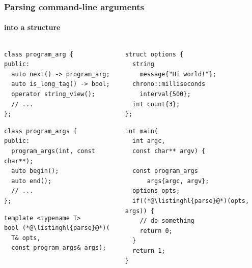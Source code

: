 \documentclass[compress,table,xcolor=table]{beamer}
\begin{document}
\begin{frame}[fragile]
  \frametitle{Parsing command-line arguments}
  \framesubtitle{into a structure}
  \begin{columns}
    \begin{column}{.57\textwidth}
      \begin{lstlisting}[language=c++2x,basicstyle=\scriptsize\ttfamily]
class program_arg {
public:
  auto next() -> program_arg;
  auto is_long_tag() -> bool;
  operator string_view();
  // ...
};
      \end{lstlisting}
      \vfill
      \begin{lstlisting}[language=c++2x,basicstyle=\scriptsize\ttfamily]
class program_args {
public:
  program_args(int, const char**); 
  auto begin();
  auto end();
  // ...
};
      \end{lstlisting}
      \vfill
      \begin{lstlisting}[language=c++2x,basicstyle=\scriptsize\ttfamily]
template <typename T>
bool (*@\listinghl{parse}@*)(
  T& opts,
  const program_args& args);
      \end{lstlisting}
    \end{column}
    \begin{column}{.44\textwidth}
      \begin{lstlisting}[language=c++2x,basicstyle=\scriptsize\ttfamily]
struct options {
  string
    message{"Hi world!"};
  chrono::milliseconds
    interval{500};
  int count{3};
};
      \end{lstlisting}
      \vfill
      \begin{lstlisting}[language=c++2x,basicstyle=\scriptsize\ttfamily]
int main(
  int argc,
  const char** argv) {

  const program_args
      args{argc, argv};
  options opts;
  if((*@\listinghl{parse}@*)(opts, args)) {
    // do something
    return 0;
  }
  return 1;
}
      \end{lstlisting}
    \end{column}
  \end{columns}
\end{frame}
\end{document}
